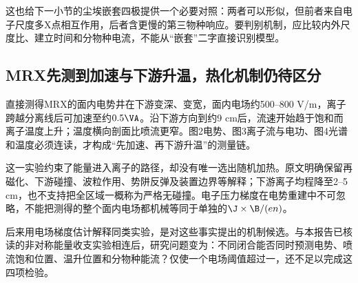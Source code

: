这也给下一小节的尘埃嵌套四极提供一个必要对照：两者可以形似，但前者来自电子尺度多X点相互作用，后者含更慢的第三物种响应。要判别机制，应比较内外尺度比、建立时间和分物种电流，不能从“嵌套”二字直接识别模型。

\subsection{MRX先测到加速与下游升温，热化机制仍待区分}\label{sec:synthesis-mrx}
\citet{Yoo2013}直接测得MRX的面内电势井在下游变深、变宽，面内电场约500--800 V/m，离子跨越分离线后可加速至约$0.5\VA$。沿下游方向到约9 cm后，流速开始趋于饱和而离子温度上升；温度横向剖面比喷流更窄。图2电势、图3离子流与电功、图4光谱和温度必须连读，才构成“先加速、再下游升温”的测量链。

这一实验约束了能量进入离子的路径，却没有唯一选出随机加热。原文明确保留再磁化、下游碰撞、波粒作用、势阱反弹及装置边界等解释；下游离子均程降至2--5 cm，也不支持把全区域一概称为严格无碰撞。电子压力梯度在电势重建中不可忽略，不能把测得的整个面内电场都机械等同于单独的$\J\times\B/(en)$。

\citet{L272}后来用电场梯度估计解释同类实验，是对这些事实提出的机制候选。与本报告已核读的非对称能量收支实验\citep{Yamada2018}相连后，研究问题变为：不同闭合能否同时预测电势、喷流饱和位置、温升位置和分物种能流？仅使一个电场阈值超过一，还不足以完成这四项检验。
